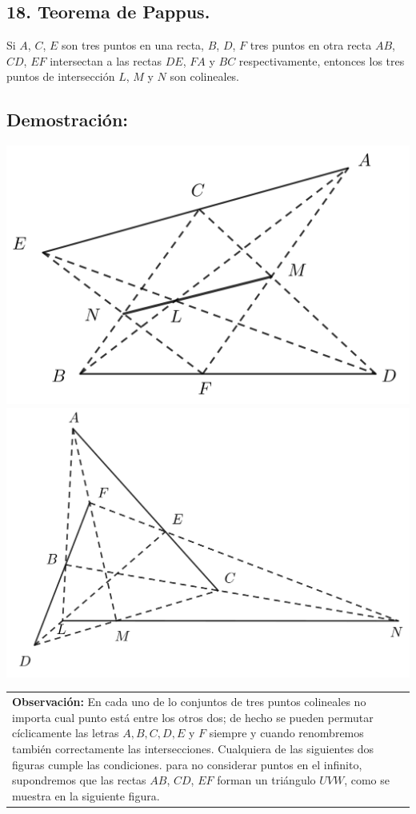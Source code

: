 \documentclass[12pt,a4paper]{article}
\begin{document}
\subsection*{18. Teorema de Pappus.}
Si $A$, $C$, $E$ son tres puntos en una recta, $B$, $D$, $F$ tres puntos en otra recta $AB$, $CD$, $EF$ intersectan a las rectas $DE$, $FA$ y $BC$ respectivamente, entonces los tres puntos de intersección $L$, $M$ y $N$ son colineales.
\subsection*{Demostración:}
\begin{center}
\includegraphics[scale=0.45]{Imagenes/pappus.png} 
\includegraphics[scale=0.45]{Imagenes/pappus1.png} 
\end{center}
\begin{tabular}{p{15.9 cm} p{1cm}}
\textbf{Observación:} En cada uno de lo conjuntos de tres puntos colineales no importa cual punto está entre los otros dos; de hecho se pueden permutar cíclicamente las letras $A, B, C, D, E$ y $F$ siempre y cuando renombremos también  correctamente las intersecciones. Cualquiera de las siguientes dos figuras cumple las condiciones. para no considerar puntos en el infinito, supondremos que las rectas $AB$, $CD$, $EF$ forman un triángulo $UVW$, como se muestra en la siguiente figura.
\end{tabular}
\end{document}
